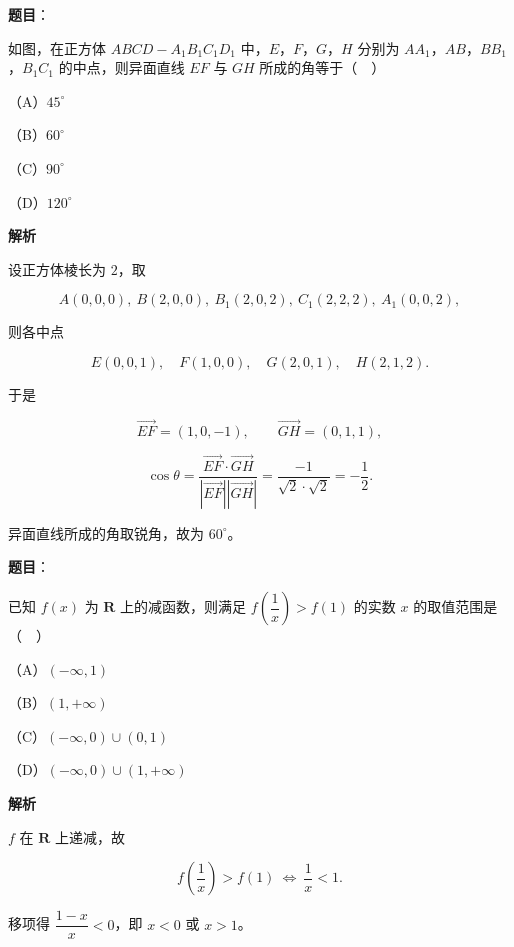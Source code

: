 \begin{answer}

\textbf{题目}：

如图，在正方体 $ABCD-A_1B_1C_1D_1$ 中，$E$，$F$，$G$，$H$ 分别为 $AA_1$，$AB$，$BB_1$，$B_1C_1$ 的中点，则异面直线 $EF$ 与 $GH$ 所成的角等于（　）
\nopagebreak[4]
\begin{center}\end{center}
\nopagebreak[4]
（A）$45^\circ$

（B）$60^\circ$

（C）$90^\circ$

（D）$120^\circ$

\textbf{解析}

设正方体棱长为 $2$，取

\nopagebreak[4]
\[A(0,0,0),\ B(2,0,0),\ B_1(2,0,2),\ C_1(2,2,2),\ A_1(0,0,2),\]

则各中点

\nopagebreak[4]
\[E(0,0,1),\quad F(1,0,0),\quad G(2,0,1),\quad H(2,1,2).\]

于是

\nopagebreak[4]
\[\overrightarrow{EF}=(1,0,-1),\qquad \overrightarrow{GH}=(0,1,1),\]

\nopagebreak[4]
\[\cos\theta=\frac{\overrightarrow{EF}\cdot\overrightarrow{GH}}{\left|\overrightarrow{EF}\right|\left|\overrightarrow{GH}\right|}
=\frac{-1}{\sqrt2\cdot\sqrt2}=-\frac12.\]

异面直线所成的角取锐角，故为 $60^\circ$。


\end{answer}
\begin{answer}

\textbf{题目}：

已知 $f(x)$ 为 $\mathbf R$ 上的减函数，则满足 $f\left(\dfrac1x\right)>f(1)$ 的实数 $x$ 的取值范围是（　）

（A）$(-\infty,1)$

（B）$(1,+\infty)$

（C）$(-\infty,0)\cup(0,1)$

（D）$(-\infty,0)\cup(1,+\infty)$

\textbf{解析}

$f$ 在 $\mathbf R$ 上递减，故

\nopagebreak[4]
\[f\left(\frac1x\right)>f(1)\ \Longleftrightarrow\ \frac1x<1.\]

移项得 $\dfrac{1-x}x<0$，即 $x<0$ 或 $x>1$。


\end{answer}
